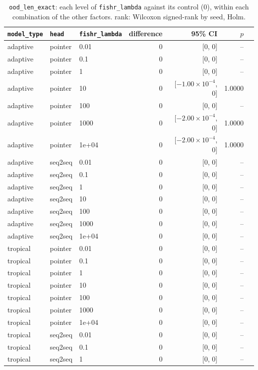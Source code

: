 \documentclass[10pt]{article}
\begin{document}
{\small
\begin{longtable}{lllrrrl}
\caption{\texttt{ood\_len\_exact}: each level of \texttt{fishr\_lambda} against its control (0), within each combination of the other factors. rank: Wilcoxon signed-rank by seed, Holm.}\label{tab:control-ood_len_exact}\\
\toprule
\texttt{model\_type} & \texttt{head} & \texttt{fishr\_lambda} & difference & 95\% CI & $p$ & \\
\midrule
\endhead
adaptive & pointer & 0.01 & 0 & [0, 0] & -- & \\
adaptive & pointer & 0.1 & 0 & [0, 0] & -- & \\
adaptive & pointer & 1 & 0 & [0, 0] & -- & \\
adaptive & pointer & 10 & 0 & [$-1.00\times10^{-4}$, 0] & 1.0000 & \\
adaptive & pointer & 100 & 0 & [0, 0] & -- & \\
adaptive & pointer & 1000 & 0 & [$-2.00\times10^{-4}$, 0] & 1.0000 & \\
adaptive & pointer & 1e+04 & 0 & [$-2.00\times10^{-4}$, 0] & 1.0000 & \\
adaptive & seq2seq & 0.01 & 0 & [0, 0] & -- & \\
adaptive & seq2seq & 0.1 & 0 & [0, 0] & -- & \\
adaptive & seq2seq & 1 & 0 & [0, 0] & -- & \\
adaptive & seq2seq & 10 & 0 & [0, 0] & -- & \\
adaptive & seq2seq & 100 & 0 & [0, 0] & -- & \\
adaptive & seq2seq & 1000 & 0 & [0, 0] & -- & \\
adaptive & seq2seq & 1e+04 & 0 & [0, 0] & -- & \\
tropical & pointer & 0.01 & 0 & [0, 0] & -- & \\
tropical & pointer & 0.1 & 0 & [0, 0] & -- & \\
tropical & pointer & 1 & 0 & [0, 0] & -- & \\
tropical & pointer & 10 & 0 & [0, 0] & -- & \\
tropical & pointer & 100 & 0 & [0, 0] & -- & \\
tropical & pointer & 1000 & 0 & [0, 0] & -- & \\
tropical & pointer & 1e+04 & 0 & [0, 0] & -- & \\
tropical & seq2seq & 0.01 & 0 & [0, 0] & -- & \\
tropical & seq2seq & 0.1 & 0 & [0, 0] & -- & \\
tropical & seq2seq & 1 & 0 & [0, 0] & -- & \\

\end{longtable}}
\end{document}
